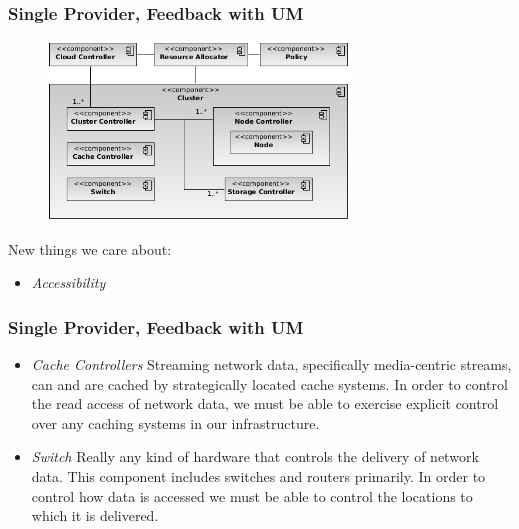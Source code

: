 \documentclass[t, 10pt]{beamer}
\begin{document}
\begin{frame}
\frametitle{Single Provider, Feedback with UM}

\begin{figure}
\includegraphics[width = 8cm]{Single-UM}
\end{figure}

New things we care about: \\
\begin{itemize}
\item \textit{Accessibility}
\end{itemize}

\end{frame}

\begin{frame}
\frametitle{Single Provider, Feedback with UM}

\begin{itemize}
\item \textit{Cache Controllers} Streaming network data, specifically media-centric streams, can and are cached by strategically located cache systems.  In order to control the read access of network data, we must be able to exercise explicit control over any caching systems in our infrastructure.
\item \textit{Switch} Really any kind of hardware that controls the delivery of network data.  This component includes switches and routers primarily.  In order to control how data is accessed we must be able to control the locations to which it is delivered.
\end{itemize}

\end{frame}
\end{document}
